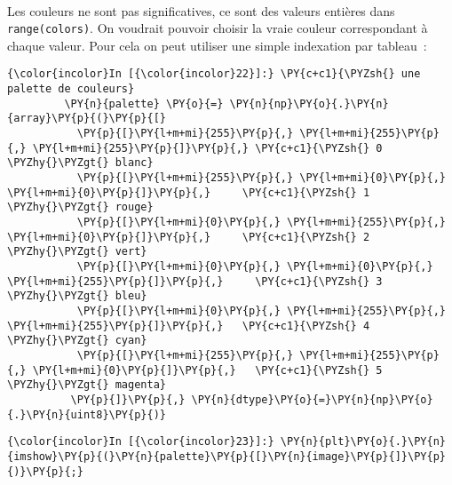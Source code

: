     \begin{center}
    \end{center}
    { \hspace*{\fill} \\}
    
    Les couleurs ne sont pas significatives, ce sont des valeurs entières
dans \texttt{range(colors)}. On voudrait pouvoir choisir la vraie
couleur correspondant à chaque valeur. Pour cela on peut utiliser une
simple indexation par tableau~:

    \begin{Verbatim}[commandchars=\\\{\},frame=single,framerule=0.3mm,rulecolor=\color{cellframecolor}]
{\color{incolor}In [{\color{incolor}22}]:} \PY{c+c1}{\PYZsh{} une palette de couleurs}
         \PY{n}{palette} \PY{o}{=} \PY{n}{np}\PY{o}{.}\PY{n}{array}\PY{p}{(}\PY{p}{[}
           \PY{p}{[}\PY{l+m+mi}{255}\PY{p}{,} \PY{l+m+mi}{255}\PY{p}{,} \PY{l+m+mi}{255}\PY{p}{]}\PY{p}{,} \PY{c+c1}{\PYZsh{} 0 \PYZhy{}\PYZgt{} blanc}
           \PY{p}{[}\PY{l+m+mi}{255}\PY{p}{,} \PY{l+m+mi}{0}\PY{p}{,} \PY{l+m+mi}{0}\PY{p}{]}\PY{p}{,}     \PY{c+c1}{\PYZsh{} 1 \PYZhy{}\PYZgt{} rouge}
           \PY{p}{[}\PY{l+m+mi}{0}\PY{p}{,} \PY{l+m+mi}{255}\PY{p}{,} \PY{l+m+mi}{0}\PY{p}{]}\PY{p}{,}     \PY{c+c1}{\PYZsh{} 2 \PYZhy{}\PYZgt{} vert}
           \PY{p}{[}\PY{l+m+mi}{0}\PY{p}{,} \PY{l+m+mi}{0}\PY{p}{,} \PY{l+m+mi}{255}\PY{p}{]}\PY{p}{,}     \PY{c+c1}{\PYZsh{} 3 \PYZhy{}\PYZgt{} bleu}
           \PY{p}{[}\PY{l+m+mi}{0}\PY{p}{,} \PY{l+m+mi}{255}\PY{p}{,} \PY{l+m+mi}{255}\PY{p}{]}\PY{p}{,}   \PY{c+c1}{\PYZsh{} 4 \PYZhy{}\PYZgt{} cyan}
           \PY{p}{[}\PY{l+m+mi}{255}\PY{p}{,} \PY{l+m+mi}{255}\PY{p}{,} \PY{l+m+mi}{0}\PY{p}{]}\PY{p}{,}   \PY{c+c1}{\PYZsh{} 5 \PYZhy{}\PYZgt{} magenta}
          \PY{p}{]}\PY{p}{,} \PY{n}{dtype}\PY{o}{=}\PY{n}{np}\PY{o}{.}\PY{n}{uint8}\PY{p}{)}
\end{Verbatim}


    \begin{Verbatim}[commandchars=\\\{\},frame=single,framerule=0.3mm,rulecolor=\color{cellframecolor}]
{\color{incolor}In [{\color{incolor}23}]:} \PY{n}{plt}\PY{o}{.}\PY{n}{imshow}\PY{p}{(}\PY{n}{palette}\PY{p}{[}\PY{n}{image}\PY{p}{]}\PY{p}{)}\PY{p}{;}
\end{Verbatim}


    \begin{center}
    \end{center}
    { \hspace*{\fill} \\}
    
